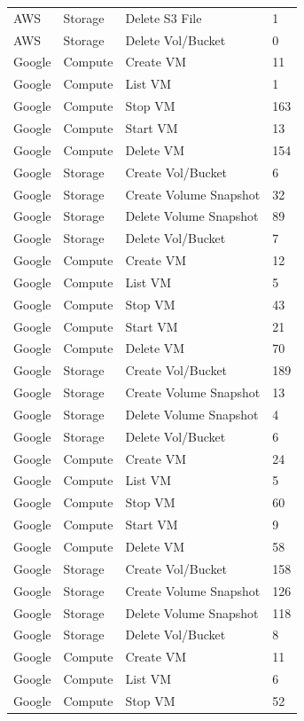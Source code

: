 \begin{table}[htb]
\begin{tabular} {p{3cm}|p{3cm}|p{5cm}|p{3cm}}
AWS & Storage & Delete S3 File & 1  \\
AWS & Storage & Delete Vol/Bucket & 0  \\
Google & Compute & Create VM & 11  \\
Google & Compute & List VM & 1  \\
Google & Compute & Stop VM & 163  \\
Google & Compute & Start VM & 13  \\
Google & Compute & Delete VM & 154  \\
Google & Storage & Create Vol/Bucket & 6  \\
Google & Storage & Create Volume Snapshot & 32  \\
Google & Storage & Delete Volume Snapshot & 89  \\
Google & Storage & Delete Vol/Bucket & 7  \\
Google & Compute & Create VM & 12  \\
Google & Compute & List VM & 5  \\
Google & Compute & Stop VM & 43  \\
Google & Compute & Start VM & 21  \\
Google & Compute & Delete VM & 70  \\
Google & Storage & Create Vol/Bucket & 189  \\
Google & Storage & Create Volume Snapshot & 13  \\
Google & Storage & Delete Volume Snapshot & 4  \\
Google & Storage & Delete Vol/Bucket & 6  \\
Google & Compute & Create VM & 24  \\
Google & Compute & List VM & 5  \\
Google & Compute & Stop VM & 60  \\
Google & Compute & Start VM & 9  \\
Google & Compute & Delete VM & 58  \\
Google & Storage & Create Vol/Bucket & 158  \\
Google & Storage & Create Volume Snapshot & 126  \\
Google & Storage & Delete Volume Snapshot & 118  \\
Google & Storage & Delete Vol/Bucket & 8  \\
Google & Compute & Create VM & 11  \\
Google & Compute & List VM & 6  \\
Google & Compute & Stop VM & 52  \\

\end{tabular}
\end{table}
